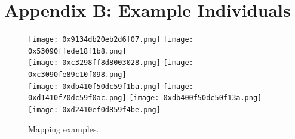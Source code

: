 \documentclass{article}
\begin{document}
\section*{Appendix B: Example Individuals}
\vspace{-2mm}
\begin{figure}[h!!t]
	\begin{center}
		\texttt{[image: 0x9134db20eb2d6f07.png]}
		\texttt{[image: 0x53090ffede18f1b8.png]}\\
		\vspace{2mm}
		\texttt{[image: 0xc3298ff8d8003028.png]}
		\texttt{[image: 0xc3090fe89c10f098.png]}\\
		\vspace{2mm}
		\texttt{[image: 0xdb410f50dc59f1ba.png]}
		\texttt{[image: 0xd1410f70dc59f0ac.png]}
		\vspace{2mm}
		\texttt{[image: 0xdb400f50dc50f13a.png]}
		\texttt{[image: 0xd2410ef0d859f4be.png]}
	\end{center}
	\caption{Mapping examples.}
	\label{projections}
\end{figure}
\end{document}
